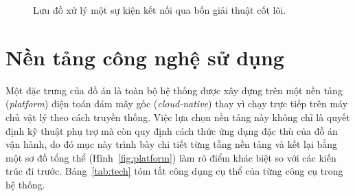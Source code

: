 \begin{figure}[H]
  \centering
  \resizebox{0.62\linewidth}{!}{}
  \caption{Lưu đồ xử lý một sự kiện kết nối qua bốn giải thuật cốt lõi.}
  \label{fig:detect-flow}
\end{figure}

\section{Nền tảng công nghệ sử dụng}
\label{sec:tech-stack}

Một đặc trưng của đồ án là toàn bộ hệ thống được xây dựng trên một nền tảng
(\textit{platform}) điện toán đám mây gốc (\textit{cloud-native}) thay vì chạy trực
tiếp trên máy chủ vật lý theo cách truyền thống. Việc lựa chọn nền tảng này không chỉ
là quyết định kỹ thuật phụ trợ mà còn quy định cách thức ứng dụng đặc thù của đồ án
vận hành, do đó mục này trình bày chi tiết từng tầng nền tảng và kết lại bằng một sơ
đồ tổng thể (Hình~\ref{fig:platform}) làm rõ điểm khác biệt so với các kiến trúc đi
trước. Bảng~\ref{tab:tech} tóm tắt công dụng cụ thể của từng công cụ trong hệ thống.

